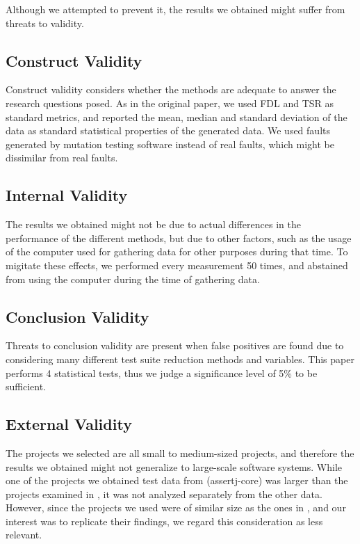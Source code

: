 Although we attempted to prevent it, the results we obtained might suffer
from threats to validity.

\subsection{Construct Validity}

Construct validity considers whether the methods are adequate to answer
the research questions posed. As in the original paper, we used FDL
and TSR as standard metrics, and reported the mean, median and standard
deviation of the data as standard statistical properties of the generated
data. We used faults generated by mutation testing software instead
of real faults, which might be dissimilar from real faults.

\subsection{Internal Validity}

The results we obtained might not be due to actual differences in
the performance of the different methods, but due to other factors,
such as the usage of the computer used for gathering data for other
purposes during that time. To migitate these effects, we performed every
measurement 50 times, and abstained from using the computer during the
time of gathering data.


\subsection{Conclusion Validity}

Threats to conclusion validity are present when false positives are
found due to considering many different test suite reduction methods
and variables. This paper performs 4 %
statistical tests, thus we judge a significance level of 5\% to be
sufficient.

\subsection{External Validity}

The projects we selected are all small to medium-sized projects,
and therefore the results we obtained might not generalize to
large-scale software systems. While one of the projects we obtained
test data from (assertj-core) was larger than the projects examined in
\cite{cruciani2019scalable}, it was not analyzed separately from the
other data. However, since the projects we used were of similar size
as the ones in \cite{cruciani2019scalable}, and our interest was to
replicate their findings, we regard this consideration as less relevant.
